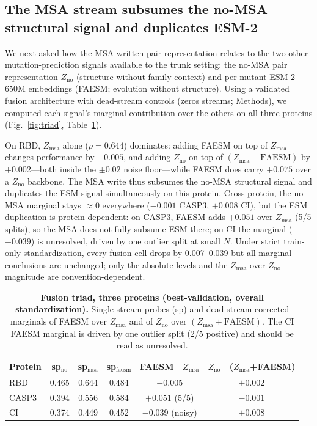 \documentclass[11pt]{article}
\newcommand{\Zmsa}{\ensuremath{Z_{\mathrm{msa}}}}
\newcommand{\Zno}{\ensuremath{Z_{\mathrm{no}}}}
\begin{document}
\subsection{The MSA stream subsumes the no-MSA structural signal and duplicates ESM-2}
\label{sec:triad}

We next asked how the MSA-written pair representation relates to the two other
mutation-prediction signals available to the trunk setting: the no-MSA pair
representation \Zno{} (structure without family context) and per-mutant ESM-2
650M embeddings (FAESM; evolution without structure). Using a validated
fusion architecture with dead-stream controls (zeros streams; Methods), we
computed each signal's marginal contribution over the others on all three
proteins (Fig.~\ref{fig:triad}, Table~\ref{tab:triad}).

On RBD, \Zmsa{} alone ($\rho=0.644$) dominates: adding FAESM on top of \Zmsa{}
changes performance by $-0.005$, and adding \Zno{} on top of
$(\Zmsa{+}\mathrm{FAESM})$ by $+0.002$---both inside the $\pm0.02$ noise
floor---while FAESM does carry $+0.075$ over a \Zno{} backbone. The MSA write
thus subsumes the no-MSA structural signal and duplicates the ESM signal
simultaneously on this protein. Cross-protein, the no-MSA marginal stays
$\approx 0$ everywhere ($-0.001$ CASP3, $+0.008$ CI), but the ESM duplication
is protein-dependent: on CASP3, FAESM adds $+0.051$ over \Zmsa{} (5/5
splits), so the MSA does not fully subsume ESM there; on CI the marginal
($-0.039$) is unresolved, driven by one outlier split at small $N$. Under
strict train-only standardization, every fusion cell drops by 0.007--0.039 but
all marginal conclusions are unchanged; only the absolute levels and the
\Zmsa{}-over-\Zno{} magnitude are convention-dependent.

\begin{table}[t]
\centering
\caption{\textbf{Fusion triad, three proteins (best-validation, overall
standardization).} Single-stream probes (sp) and dead-stream-corrected
marginals of FAESM over \Zmsa{} and of \Zno{} over $(\Zmsa{+}\mathrm{FAESM})$.
The CI FAESM marginal is driven by one outlier split (2/5 positive) and should
be read as unresolved.}
\label{tab:triad}
\small
\begin{tabular}{lccccc}
\toprule
Protein & sp$_{\mathrm{no}}$ & sp$_{\mathrm{msa}}$ & sp$_{\mathrm{faesm}}$ &
FAESM $\mid$ \Zmsa{} & \Zno{} $\mid$ (\Zmsa{}+FAESM) \\
\midrule
RBD   & 0.465 & 0.644 & 0.484 & $-0.005$ & $+0.002$ \\
CASP3 & 0.394 & 0.556 & 0.584 & $+0.051$ (5/5) & $-0.001$ \\
CI    & 0.374 & 0.449 & 0.452 & $-0.039$ (noisy) & $+0.008$ \\
\bottomrule
\end{tabular}
\end{table}
\end{document}
